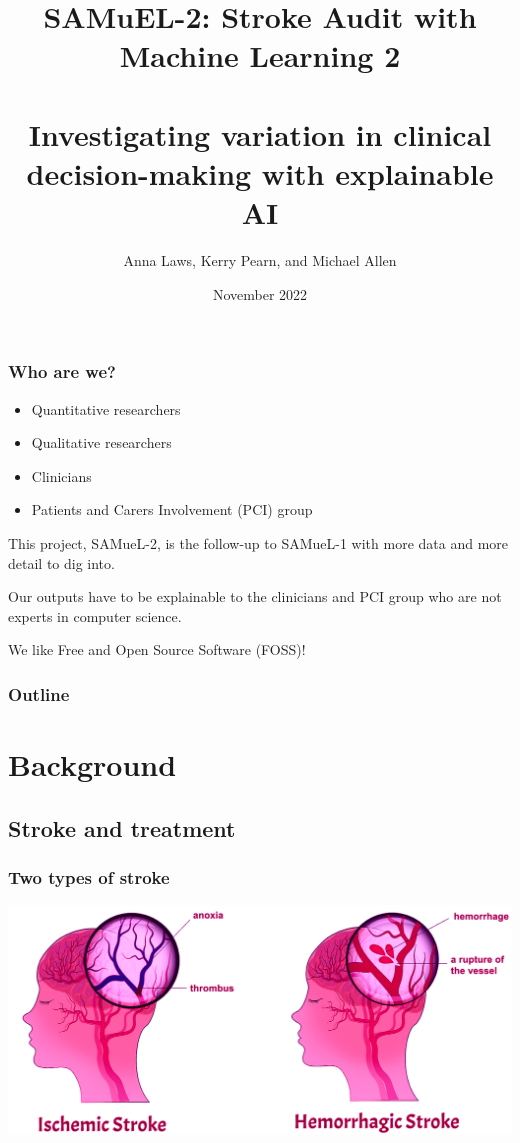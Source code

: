 \documentclass[xcolor={usenames,dvipsnames}]{beamer}
\title{SAMuEL-2: Stroke Audit with Machine Learning 2\\\phantom{blank line please}\\Investigating variation in clinical decision-making with explainable AI}
\author[Anna Laws]{Anna Laws, Kerry Pearn, and Michael Allen}
\institute{University of Exeter Medical School, PenCHORD}
\date{November 2022}%
\begin{document}




\begin{frame}
\frametitle{Who are we?}

\begin{itemize}
    \item Quantitative researchers 
    \item Qualitative researchers 
    \item Clinicians 
    \item Patients and Carers Involvement (PCI) group 
\end{itemize}

\vspace{1em}
This project, SAMueL-2, is the follow-up to SAMueL-1 with
more data and more detail to dig into. 

\vspace{1em}
Our outputs have to be explainable to the clinicians and PCI group who are not experts in computer science. 

\vspace{1em}
We like Free and Open Source Software (FOSS)! 

\end{frame}



\begin{frame}
\frametitle{Outline}
\tableofcontents
\end{frame}


\section{Background}
\subsection{Stroke and treatment} %




\begin{frame}
\frametitle{Two types of stroke}
\includegraphics[width=1.0\textwidth]{./images/stroke_types}
\end{frame}
\end{document}
